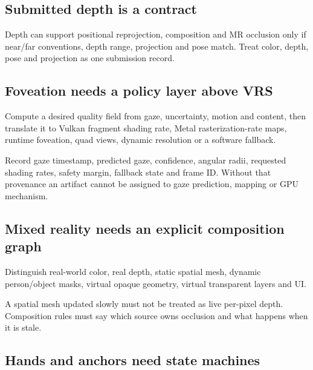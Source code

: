 \subsection{Submitted depth is a contract}\label{06-engine-ii-ch042-submitted-depth-is-a-contract}

\hypertarget{06-engine-ii-ch042-submitted-depth-is-a-contract}{}

Depth can support positional reprojection, composition and MR occlusion only if near/far conventions, depth range, projection and pose match. Treat color, depth, pose and projection as one submission record.

\subsection{Foveation needs a policy layer above VRS}\label{06-engine-ii-ch042-foveation-needs-a-policy-layer-above-vrs}

\hypertarget{06-engine-ii-ch042-foveation-needs-a-policy-layer-above-vrs}{}

Compute a desired quality field from gaze, uncertainty, motion and content, then translate it to Vulkan fragment shading rate, Metal rasterization-rate maps, runtime foveation, quad views, dynamic resolution or a software fallback.

Record gaze timestamp, predicted gaze, confidence, angular radii, requested shading rates, safety margin, fallback state and frame ID. Without that provenance an artifact cannot be assigned to gaze prediction, mapping or GPU mechanism.

\subsection{Mixed reality needs an explicit composition graph}\label{06-engine-ii-ch042-mixed-reality-needs-an-explicit-composition-graph}

\hypertarget{06-engine-ii-ch042-mixed-reality-needs-an-explicit-composition-graph}{}

Distinguish real-world color, real depth, static spatial mesh, dynamic person/object masks, virtual opaque geometry, virtual transparent layers and UI.

A spatial mesh updated slowly must not be treated as live per-pixel depth. Composition rules must say which source owns occlusion and what happens when it is stale.

\subsection{Hands and anchors need state machines}\label{06-engine-ii-ch042-hands-and-anchors-need-state-machines}

